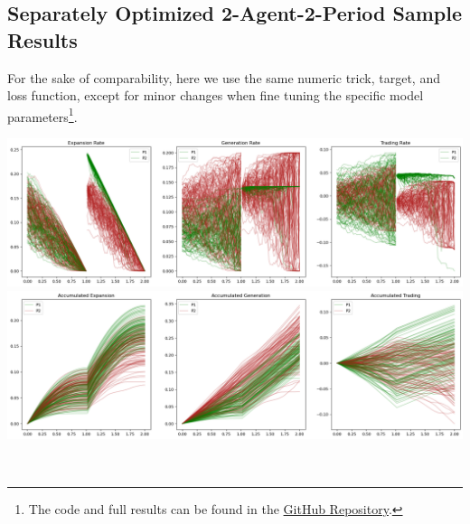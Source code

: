 \documentclass[a4paper,10pt]{article}
\newcommand{\1}{\mathbf{1}}
\begin{document}
\newpage  %

\subsection{Separately Optimized 2-Agent-2-Period Sample Results}

For the sake of comparability, here we use the same numeric trick, target, and loss function, except for minor changes when fine tuning the specific model parameters\footnote{The code and full results can be found in the \href{https://github.com/OrangeAoo/PA-MFG-FBSDE/blob/FBSDE/2Period/Separate_Optim_1Prdx2/Adamax_clamp_sig_MSE.ipynb}{GitHub Repository}.}.

\begin{minipage}{\textwidth}
  \centering
  \begin{minipage}[h]{0.8\textwidth}
    \centering
    \includegraphics[]{FinalReports/Illustration_diagrams/Seprt-2A2P-Sigmoid-ResExamples/Rates.png}\\
    \includegraphics[]{FinalReports/Illustration_diagrams/Seprt-2A2P-Sigmoid-ResExamples/AccumRates.png}\\
    \label{fig:decomp-gen-sep}
  \end{minipage}\\
  \vspace{20pt}
  \begin{minipage}[h]{0.65\textwidth}
    \centering

\end{minipage}
\end{minipage}
\end{document}
